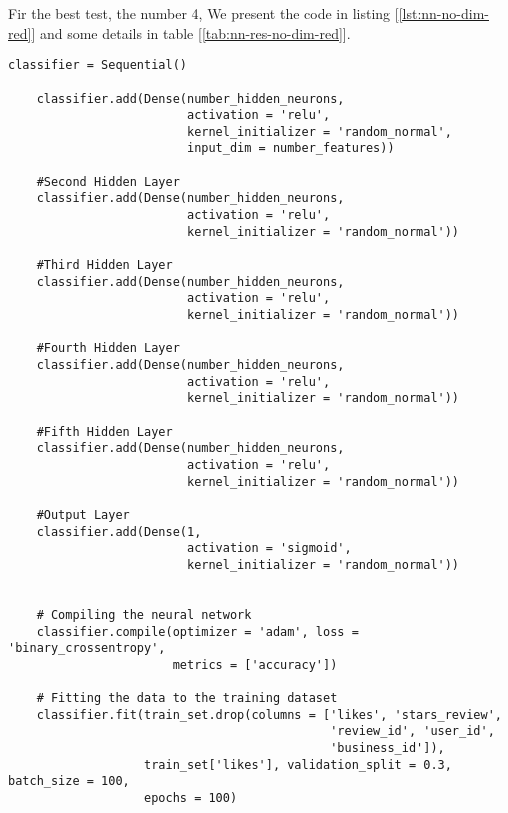 Fir the best test, the number 4, We present the code in listing [\ref{lst:nn-no-dim-red}] and some details in table [\ref{tab:nn-res-no-dim-red}].

\begin{lstlisting}[caption={Neural Network without dimensionality reduction},label={lst:nn-no-dim-red}]
    classifier = Sequential()
    
    classifier.add(Dense(number_hidden_neurons, 
                         activation = 'relu', 
                         kernel_initializer = 'random_normal', 
                         input_dim = number_features))
    
    #Second Hidden Layer
    classifier.add(Dense(number_hidden_neurons, 
                         activation = 'relu', 
                         kernel_initializer = 'random_normal'))
    
    #Third Hidden Layer
    classifier.add(Dense(number_hidden_neurons, 
                         activation = 'relu', 
                         kernel_initializer = 'random_normal'))

    #Fourth Hidden Layer
    classifier.add(Dense(number_hidden_neurons, 
                         activation = 'relu', 
                         kernel_initializer = 'random_normal'))
    
    #Fifth Hidden Layer
    classifier.add(Dense(number_hidden_neurons, 
                         activation = 'relu', 
                         kernel_initializer = 'random_normal'))
    
    #Output Layer
    classifier.add(Dense(1, 
                         activation = 'sigmoid', 
                         kernel_initializer = 'random_normal'))
    
    
    # Compiling the neural network
    classifier.compile(optimizer = 'adam', loss = 'binary_crossentropy',
                       metrics = ['accuracy'])
    
    # Fitting the data to the training dataset
    classifier.fit(train_set.drop(columns = ['likes', 'stars_review',
                                             'review_id', 'user_id', 
                                             'business_id']),
                   train_set['likes'], validation_split = 0.3, batch_size = 100,
                   epochs = 100)
\end{lstlisting}

